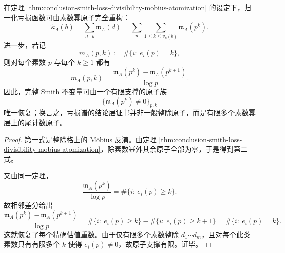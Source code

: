 \begin{corollary}\label{cor:conclusion-smith-valuation-finite-atomic-certificate}
在定理 \ref{thm:conclusion-smith-loss-divisibility-mobius-atomization} 的设定下，归一化亏损函数可由素数幂原子完全重构：
\[
\widetilde\kappa_A(b)=\sum_{d\mid b}\mathfrak m_A(d)
=
\sum_{p}\sum_{1\le k\le v_p(b)}\mathfrak m_A(p^k).
\]
进一步，若记
\[
m_{A}(p,k):=\#\{i:\ e_i(p)=k\},
\]
则对每个素数 \(p\) 与每个 \(k\ge 1\) 都有
\[
\boxed{\;
m_A(p,k)
=
\frac{\mathfrak m_A(p^k)-\mathfrak m_A(p^{k+1})}{\log p}.\;}
\]
因此，完整 Smith 不变量可由一个有限支撑的原子族
\[
\{\mathfrak m_A(p^k)\neq 0\}_{p,k}
\]
唯一恢复；换言之，亏损谱的结论层证书并非一般整除原子，而是有限多个素数幂层上的尾计数原子。
\end{corollary}
\begin{proof}
第一式是整除格上的 Möbius 反演。由定理 \ref{thm:conclusion-smith-loss-divisibility-mobius-atomization}，除素数幂外其余原子全部为零，于是得到第二式。

又由同一定理，
\[
\frac{\mathfrak m_A(p^k)}{\log p}
=
\#\{i:\ e_i(p)\ge k\}.
\]
故相邻差分给出
\[
\frac{\mathfrak m_A(p^k)-\mathfrak m_A(p^{k+1})}{\log p}
=
\#\{i:\ e_i(p)\ge k\}-\#\{i:\ e_i(p)\ge k+1\}
=
\#\{i:\ e_i(p)=k\}.
\]
这就恢复了每个精确估值重数。由于仅有限多个素数整除 \(d_1\cdots d_m\)，且对每个此类素数只有有限多个 \(k\) 使得 \(e_i(p)\neq 0\)，故原子支撑有限。证毕。
\end{proof}

